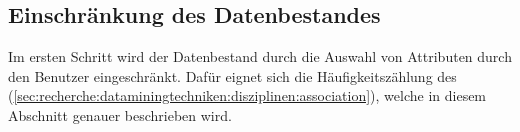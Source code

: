 
\subsection{Einschränkung des Datenbestandes}
Im ersten Schritt wird der Datenbestand durch die Auswahl von Attributen durch den Benutzer eingeschränkt. Dafür eignet sich die Häufigkeitszählung des  (\cref{sec:recherche:dataminingtechniken:disziplinen:association}), welche in diesem Abschnitt genauer beschrieben wird.

